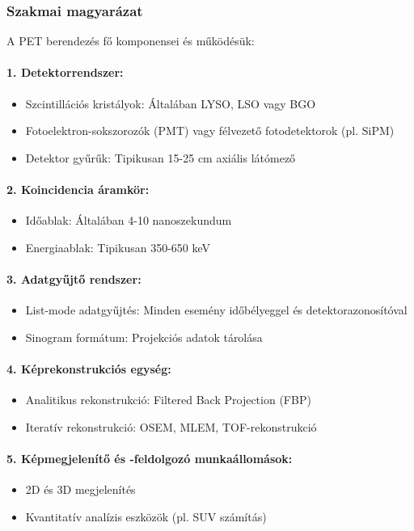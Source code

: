 \documentclass[a4paper,12pt]{article}
\begin{document}
\subsubsection{Szakmai magyarázat} A PET berendezés fő komponensei és működésük:

\paragraph{1. Detektorrendszer:} \begin{itemize} \item Szcintillációs kristályok: Általában LYSO, LSO vagy BGO \item Fotoelektron-sokszorozók (PMT) vagy félvezető fotodetektorok (pl. SiPM) \item Detektor gyűrűk: Tipikusan 15-25 cm axiális látómező \end{itemize}

\paragraph{2. Koincidencia áramkör:} \begin{itemize} \item Időablak: Általában 4-10 nanoszekundum \item Energiaablak: Tipikusan 350-650 keV \end{itemize}

\paragraph{3. Adatgyűjtő rendszer:} \begin{itemize} \item List-mode adatgyűjtés: Minden esemény időbélyeggel és detektorazonosítóval \item Sinogram formátum: Projekciós adatok tárolása \end{itemize}

\paragraph{4. Képrekonstrukciós egység:} \begin{itemize} \item Analitikus rekonstrukció: Filtered Back Projection (FBP) \item Iteratív rekonstrukció: OSEM, MLEM, TOF-rekonstrukció \end{itemize}

\paragraph{5. Képmegjelenítő és -feldolgozó munkaállomások:} \begin{itemize} \item 2D és 3D megjelenítés \item Kvantitatív analízis eszközök (pl. SUV számítás) \end{itemize}
\end{document}
